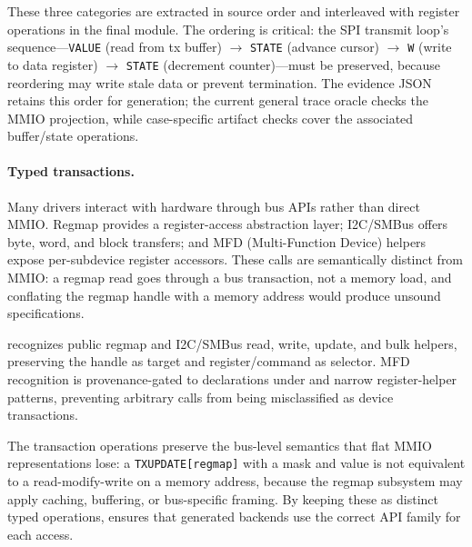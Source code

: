 These three categories are extracted in source order and interleaved with register operations in the final \rislang{} module. The ordering is critical: the SPI transmit loop's sequence---\texttt{VALUE} (read from tx buffer) $\rightarrow$ \texttt{STATE} (advance cursor) $\rightarrow$ \texttt{W} (write to data register) $\rightarrow$ \texttt{STATE} (decrement counter)---must be preserved, because reordering may write stale data or prevent termination. The evidence JSON retains this order for generation; the current general trace oracle checks the MMIO projection, while case-specific artifact checks cover the associated buffer/state operations.

\paragraph{Typed transactions.}

Many drivers interact with hardware through bus APIs rather than direct MMIO. Regmap provides a register-access abstraction layer; I2C/SMBus offers byte, word, and block transfers; and MFD (Multi-Function Device) helpers expose per-subdevice register accessors. These calls are semantically distinct from MMIO: a regmap read goes through a bus transaction, not a memory load, and conflating the regmap handle with a memory address would produce unsound specifications.

\reharness{} recognizes public regmap and I2C/SMBus read, write, update, and bulk helpers, preserving the handle as target and register/command as selector. MFD recognition is provenance-gated to declarations under  and narrow register-helper patterns, preventing arbitrary calls from being misclassified as device transactions.

The transaction operations preserve the bus-level semantics that flat MMIO representations lose: a \texttt{TXUPDATE[regmap]} with a mask and value is not equivalent to a read-modify-write on a memory address, because the regmap subsystem may apply caching, buffering, or bus-specific framing. By keeping these as distinct typed operations, \rislang{} ensures that generated backends use the correct API family for each access.
